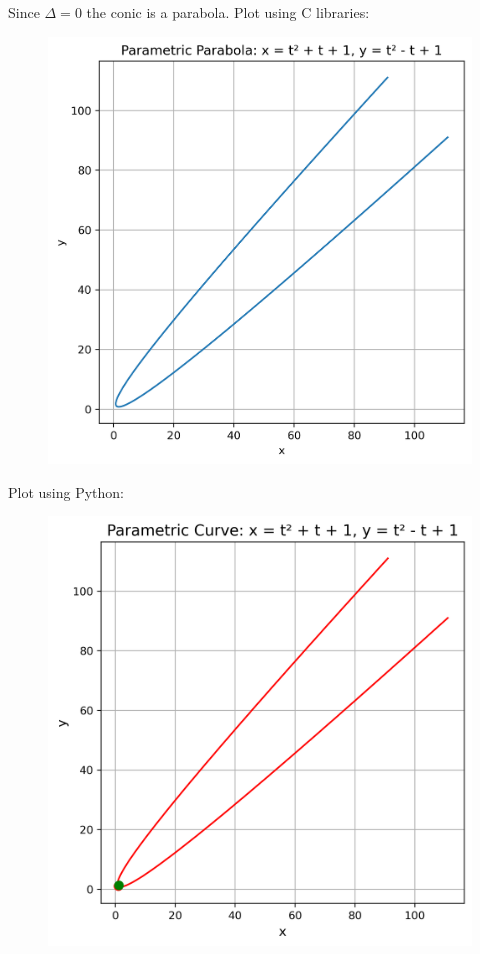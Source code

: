 \documentclass[journal,12pt,onecolumn]{IEEEtran}
\begin{document}
Since $\Delta=0$ the conic is a parabola.
Plot using C libraries:
\begin{figure}[H]
	\centering
	\includegraphics[scale=0.5]{img1}
	\caption*{}
	\label{img1}
\end{figure}
Plot using Python:
\begin{figure}[H]
	\centering
	\includegraphics[scale=0.5]{img2}
	\caption*{}
	\label{img2}
\end{figure}
\end{document}
